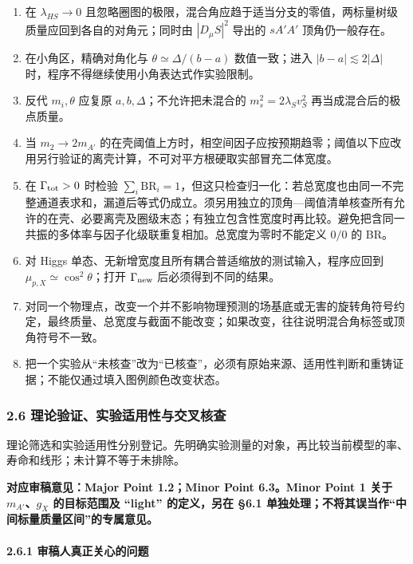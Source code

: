 \documentclass[
]{article}
\providecommand{\tightlist}{%
  \setlength{\itemsep}{0pt}\setlength{\parskip}{0pt}}
\begin{document}
\begin{enumerate}
\def\labelenumi{\arabic{enumi}.}
\tightlist
\item
  在 \(\lambda_{HS}\to0\)
  且忽略圈图的极限，混合角应趋于适当分支的零值，两标量树级质量应回到各自的对角元；同时由
  \(|D_\mu S|^2\) 导出的 \(sA'A'\) 顶角仍一般存在。
\item
  在小角区，精确对角化与 \(\theta\simeq\Delta/(b-a)\) 数值一致；进入
  \(|b-a|\lesssim2|\Delta|\) 时，程序不得继续使用小角表达式作实验限制。
\item
  反代 \(m_i,\theta\) 应复原 \(a,b,\Delta\)；不允许把未混合的
  \(m_s^2=2\lambda_S v_S^2\) 再当成混合后的极点质量。
\item
  当 \(m_2\to2m_{A'}\)
  的在壳阈值上方时，相空间因子应按预期趋零；阈值以下应改用另行验证的离壳计算，不可对平方根硬取实部冒充二体宽度。
\item
  在 \(\Gamma_{\rm tot}>0\) 时检验
  \(\sum_i\mathrm{BR}_i=1\)，但这只检查归一化：若总宽度也由同一不完整通道表求和，漏道后等式仍成立。须另用独立的顶角---阈值清单核查所有允许的在壳、必要离壳及圈级末态；有独立包含性宽度时再比较。避免把含同一共振的多体率与因子化级联重复相加。总宽度为零时不能定义
  \(0/0\) 的 BR。
\item
  对 Higgs 单态、无新增宽度且所有耦合普适缩放的测试输入，程序应回到
  \(\mu_{p,X}\simeq\cos^2\theta\)；打开 \(\Gamma_{\rm new}\)
  后必须得到不同的结果。
\item
  对同一个物理点，改变一个并不影响物理预测的场基底或无害的旋转角符号约定，最终质量、总宽度与截面不能改变；如果改变，往往说明混合角标签或顶角符号不一致。
\item
  把一个实验从``未核查''改为``已核查''，必须有原始来源、适用性判断和重铸证据；不能仅通过填入图例颜色改变状态。
\end{enumerate}

\subsubsection{2.6
理论验证、实验适用性与交叉核查}\label{ux7406ux8bbaux9a8cux8bc1ux5b9eux9a8cux9002ux7528ux6027ux4e0eux4ea4ux53c9ux6838ux67e5}

理论筛选和实验适用性分别登记。先明确实验测量的对象，再比较当前模型的率、寿命和线形；未计算不等于未排除。

\textbf{对应审稿意见：Major Point 1.2；Minor Point 6.3。Minor Point 1
关于 \(m_{A'}\)、\(g_X\) 的目标范围及 ``light'' 的定义，另在 §6.1
单独处理；不将其误当作``中间标量质量区间''的专属意见。}

\paragraph{2.6.1
审稿人真正关心的问题}\label{ux5ba1ux7a3fux4ebaux771fux6b63ux5173ux5fc3ux7684ux95eeux9898}
\end{document}
